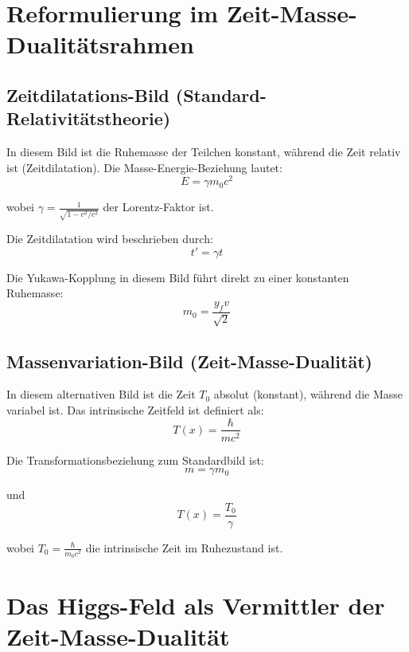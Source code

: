 \documentclass[a4paper,12pt]{article}
\newcommand{\Tfield}{T(x)} %
\begin{document}
	\section{Reformulierung im Zeit-Masse-Dualitätsrahmen}
	
	\subsection{Zeitdilatations-Bild (Standard-Relativitätstheorie)}
	
	In diesem Bild ist die Ruhemasse der Teilchen konstant, während die Zeit relativ ist (Zeitdilatation). Die Masse-Energie-Beziehung lautet:
	\begin{equation}
		E = \gamma m_0 c^2
	\end{equation}
	
	wobei $\gamma = \frac{1}{\sqrt{1-v^2/c^2}}$ der Lorentz-Faktor ist.
	
	Die Zeitdilatation wird beschrieben durch:
	\begin{equation}
		t' = \gamma t
	\end{equation}
	
	Die Yukawa-Kopplung in diesem Bild führt direkt zu einer konstanten Ruhemasse:
	\begin{equation}
		m_0 = \frac{y_f v}{\sqrt{2}}
	\end{equation}
	
	\subsection{Massenvariation-Bild (Zeit-Masse-Dualität)}
	
	In diesem alternativen Bild ist die Zeit $T_0$ absolut (konstant), während die Masse variabel ist. Das intrinsische Zeitfeld ist definiert als:
	\begin{equation}
		\Tfield = \frac{\hbar}{m c^2}
	\end{equation}
	
	Die Transformationsbeziehung zum Standardbild ist:
	\begin{equation}
		m = \gamma m_0
	\end{equation}
	
	und
	\begin{equation}
		\Tfield = \frac{T_0}{\gamma}
	\end{equation}
	
	wobei $T_0 = \frac{\hbar}{m_0 c^2}$ die intrinsische Zeit im Ruhezustand ist.
	
	\section{Das Higgs-Feld als Vermittler der Zeit-Masse-Dualität}
	
\end{document}
